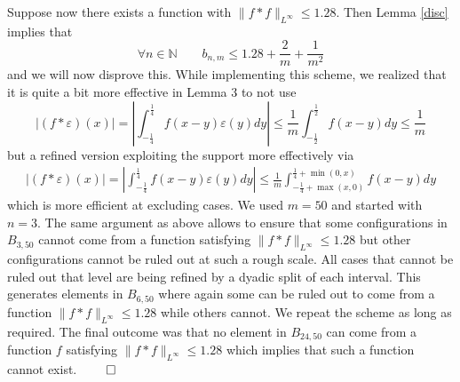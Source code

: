 \documentclass[10pt]{amsart}
\begin{document}
Suppose now there exists a function with $\|f * f \|_{L^{\infty}} \leq 1.28$. Then Lemma \ref{disc} implies that
$$ \forall n \in \mathbb{N} \qquad b_{n,m} \leq 1.28 + \frac{2}{m} + \frac{1}{m^2}$$
and we will now disprove this.  While implementing this scheme, we realized that it is quite a bit more effective in Lemma 3 to not use
$$ |(f*\varepsilon)(x)| = \left|\int_{-\frac{1}{4}}^{\frac{1}{4}}{f(x-y)\varepsilon(y) dy} \right| \leq  \frac{1}{m}\int_{-\frac{1}{2}}^{\frac{1}{2}}{f(x-y) dy} \leq \frac{1}{m}$$
but a refined version exploiting the support more effectively via
\begin{eqnarray}\label{eq:refinedLowerBound}
|(f*\varepsilon)(x)| = \left|\int_{-\frac{1}{4}}^{\frac{1}{4}}{f(x-y)\varepsilon(y) dy} \right|  \leq  \frac{1}{m}\int_{-\frac{1}{4}+\max(x,0)}^{\frac{1}{4}+\min(0,x)}{f(x-y) dy}
\end{eqnarray}
which is more efficient at excluding cases. We used $m=50$ and started with $n=3$. The same argument as above allows to ensure that some configurations in $B_{3,50}$ cannot come from
a function satisfying $\|f * f \|_{L^{\infty}} \leq 1.28$ but other configurations cannot be ruled out at such a rough scale. All cases that cannot be ruled out that level are being refined
by a dyadic split of each interval. This generates elements in $B_{6,50}$ where again some can be ruled out to come from a function $\|f * f \|_{L^{\infty}} \leq 1.28$ while others
cannot. We repeat the scheme as long as required. The final outcome was that no element in $B_{24,50}$ can come from a function $f$ satisfying $\|f * f \|_{L^{\infty}} \leq 1.28$ which implies that such a function cannot exist.  $\qed$
\end{document}
